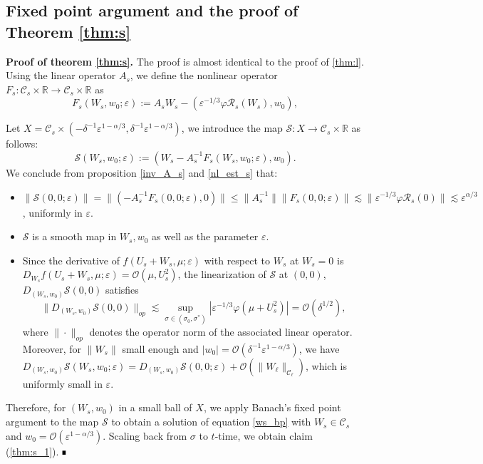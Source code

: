 \documentclass[letterpaper,11pt]{article}
\newcommand{\Ral}{\mathcal{R}}
\newcommand{\rmO}{\mathcal{O}}
\newcommand{\eps}{\varepsilon}
\newcommand{\lar}{ \lesssim }
\numberwithin{equation}{section}
\theoremstyle{plain}
\newenvironment{Proof}[1][.]%
 {\begin{trivlist}\item[]\textbf{Proof#1 }}%
 {\hspace*{\fill}$\rule{0.3\baselineskip}{0.35\baselineskip}$\end{trivlist}}
\begin{document}
\subsection{Fixed point argument and the proof of Theorem \ref{thm:s}}
\begin{Proof}[ of theorem \ref{thm:s}.]
The proof is almost identical to the proof of \ref{thm:l}. Using the linear operator $A_s$, we define the nonlinear operator
$F_s : \mathcal{C}_s \times \mathbb{R} \to \mathcal{C}_s \times \mathbb{R}$ as
\[
F_s(W_s, w_0; \eps) := A_s W_s - (\eps^{-1/3}\varphi \Ral_s(W_s), w_0),
\]

Let $X = \mathcal{C}_s \times (-\delta^{-1}\eps^{1-\alpha/3},\delta^{-1}\eps^{1-\alpha/3})$, we introduce the map $\mathcal{S}: X \to \mathcal{C}_s \times \mathbb{R}$ as follows:
\[
\mathcal{S}(W_s,w_0; \eps) := (W_s-A_s^{-1}F_s(W_s,w_0;\eps), w_0).
\]
We conclude from proposition \ref{inv_A_s} and \ref{nl_est_s} that:
\begin{itemize}
\item $\|\mathcal{S}(0,0;\eps) \|= \|\left( -A_s^{-1}F_s(0,0;\eps),0\right)\| \le \|A_s^{-1}\|\|F_s(0,0;\eps)\| \lar \|\eps^{-1/3}\varphi \Ral_s(0)\| \lar \eps^{\alpha/3}$, uniformly in $\eps$.

\item $\mathcal{S}$ is a smooth map in $W_s,w_0$ as well as the parameter $\eps$.

\item Since the derivative of $f(U_s+W_s,\mu;\eps)$ with respect to $W_s$ at $W_s=0$ is $D_{W_s} f(U_s+W_s,\mu;\eps)=\rmO(\mu, U_s^2)$, the linearization of $\mathcal{S}$ at $(0,0)$, $D_{(W_s,w_0)} \mathcal{S}(0,0)$ satisfies
\[
\|D_{(W_s,w_0)} \mathcal{S}(0,0)\|_{op} \lar \sup_{\sigma \in (\sigma_0,\sigma^*)}|\eps^{-1/3}\varphi(\mu+U_s^2)| = \rmO(\delta^{1/2}),
\]
where $\|\cdot\|_{op}$ denotes the operator norm of the associated linear operator.
Moreover, for $\|W_{s}\|$ small enough and $|w_0| =\rmO(\delta^{-1}\eps^{1-\alpha/3})$, we have $D_{(W_s,w_0)}\mathcal{S}(W_s,w_0;\eps) =  D_{(W_s,w_0)}\mathcal{S}(0,0;\eps)+\rmO(\|W_\ell\|_{\mathcal{C}_\ell})$, which is uniformly small in $\eps$.


\end{itemize}

Therefore, for $(W_s, w_0)$ in a small ball of $X$, we apply Banach's fixed point argument to the map $\mathcal{S}$ to obtain a solution of equation \eqref{ws_bp} with $W_s \in \mathcal{C}_s$ and $w_0 = \rmO(\eps^{1-\alpha/3})$. Scaling back from $\sigma$ to $t$-time, we obtain claim (\ref{thm:s_1}).
\end{Proof}
\end{document}
